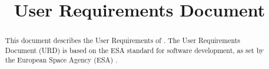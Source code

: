 

\title{User Requirements Document}

\newcommand{\TitelAbbr}{SQAP}
\newcommand{\Version}{0.0}



\maketitle

\begin{abstract}
This document describes the User Requirements of \projectname. The User Requirements Document (URD) is based on the ESA standard for software development, as set by the European Space Agency (ESA) \cite{esa}.
\end{abstract}

\tableofcontents












